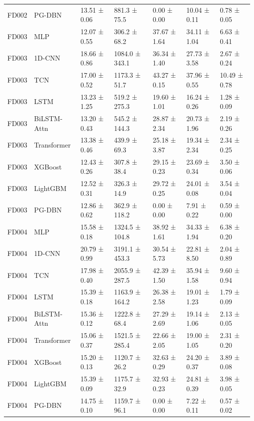 \begin{table}
\begin{tabular}{lllllll}
FD002 & PG-DBN & 13.51 ± 0.06 & 881.3 ± 75.5 & 0.00 ± 0.00 & 10.04 ± 0.11 & 0.78 ± 0.05 \\
FD003 & MLP & 12.07 ± 0.55 & 306.2 ± 68.2 & 37.67 ± 1.64 & 34.11 ± 1.04 & 6.63 ± 0.41 \\
FD003 & 1D-CNN & 18.66 ± 0.86 & 1084.0 ± 343.1 & 36.34 ± 1.40 & 27.73 ± 3.58 & 2.67 ± 0.24 \\
FD003 & TCN & 17.00 ± 0.52 & 1173.3 ± 51.7 & 43.27 ± 0.15 & 37.96 ± 0.55 & 10.49 ± 0.78 \\
FD003 & LSTM & 13.23 ± 1.25 & 519.2 ± 275.3 & 19.60 ± 1.01 & 16.24 ± 0.26 & 1.28 ± 0.09 \\
FD003 & BiLSTM-Attn & 13.20 ± 0.43 & 545.2 ± 144.3 & 28.87 ± 2.34 & 20.73 ± 1.96 & 2.19 ± 0.26 \\
FD003 & Transformer & 13.38 ± 0.46 & 439.9 ± 69.3 & 25.18 ± 3.87 & 19.34 ± 2.34 & 2.34 ± 0.25 \\
FD003 & XGBoost & 12.43 ± 0.26 & 307.8 ± 38.4 & 29.15 ± 0.23 & 23.69 ± 0.34 & 3.50 ± 0.06 \\
FD003 & LightGBM & 12.52 ± 0.31 & 326.3 ± 14.9 & 29.72 ± 0.25 & 24.01 ± 0.08 & 3.54 ± 0.04 \\
FD003 & PG-DBN & 12.86 ± 0.62 & 362.9 ± 118.2 & 0.00 ± 0.00 & 7.91 ± 0.22 & 0.59 ± 0.00 \\
FD004 & MLP & 15.58 ± 0.18 & 1324.5 ± 104.8 & 38.92 ± 1.61 & 34.33 ± 1.94 & 6.38 ± 0.20 \\
FD004 & 1D-CNN & 20.79 ± 0.99 & 3191.1 ± 453.3 & 30.54 ± 5.73 & 22.81 ± 8.50 & 2.04 ± 0.89 \\
FD004 & TCN & 17.98 ± 0.40 & 2055.9 ± 287.5 & 42.39 ± 1.50 & 35.94 ± 1.58 & 9.60 ± 0.94 \\
FD004 & LSTM & 15.39 ± 0.18 & 1163.9 ± 164.2 & 26.38 ± 2.58 & 19.01 ± 1.23 & 1.79 ± 0.09 \\
FD004 & BiLSTM-Attn & 15.36 ± 0.12 & 1222.8 ± 68.4 & 27.29 ± 2.69 & 19.14 ± 1.06 & 2.13 ± 0.05 \\
FD004 & Transformer & 15.06 ± 0.37 & 1521.5 ± 285.4 & 22.66 ± 2.05 & 19.00 ± 1.05 & 2.31 ± 0.20 \\
FD004 & XGBoost & 15.20 ± 0.13 & 1120.7 ± 26.2 & 32.63 ± 0.29 & 24.20 ± 0.37 & 3.89 ± 0.08 \\
FD004 & LightGBM & 15.39 ± 0.09 & 1175.7 ± 32.9 & 32.93 ± 0.23 & 24.81 ± 0.39 & 3.98 ± 0.05 \\
FD004 & PG-DBN & 14.75 ± 0.10 & 1159.7 ± 96.1 & 0.00 ± 0.00 & 7.22 ± 0.11 & 0.57 ± 0.02 \\
\bottomrule
\end{tabular}
\end{table}
